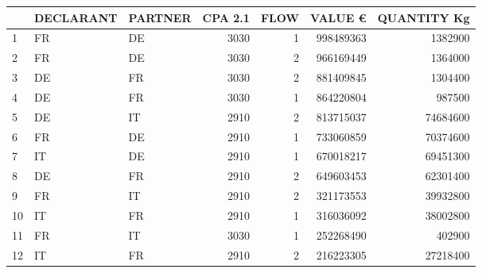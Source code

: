 \begin{tabular}{l|llrrrr}
\toprule
 & DECLARANT & PARTNER & CPA 2.1 & FLOW & VALUE € & QUANTITY Kg \\
\midrule
1 & FR & DE & 3030 & 1 & 998489363 & 1382900 \\
2 & FR & DE & 3030 & 2 & 966169449 & 1364000 \\
3 & DE & FR & 3030 & 2 & 881409845 & 1304400 \\
4 & DE & FR & 3030 & 1 & 864220804 & 987500 \\
5 & DE & IT & 2910 & 2 & 813715037 & 74684600 \\
6 & FR & DE & 2910 & 1 & 733060859 & 70374600 \\
7 & IT & DE & 2910 & 1 & 670018217 & 69451300 \\
8 & DE & FR & 2910 & 2 & 649603453 & 62301400 \\
9 & FR & IT & 2910 & 2 & 321173553 & 39932800 \\
10 & IT & FR & 2910 & 1 & 316036092 & 38002800 \\
11 & FR & IT & 3030 & 1 & 252268490 & 402900 \\
12 & IT & FR & 2910 & 2 & 216223305 & 27218400 \\
\bottomrule
\end{tabular}
